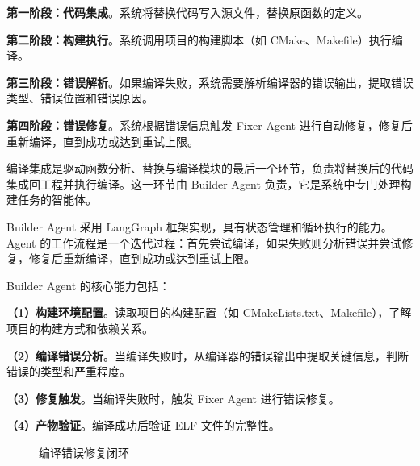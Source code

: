 \textbf{第一阶段：代码集成}。系统将替换代码写入源文件，替换原函数的定义。

\textbf{第二阶段：构建执行}。系统调用项目的构建脚本（如 CMake、Makefile）执行编译。

\textbf{第三阶段：错误解析}。如果编译失败，系统需要解析编译器的错误输出，提取错误类型、错误位置和错误原因。

\textbf{第四阶段：错误修复}。系统根据错误信息触发 Fixer Agent 进行自动修复，修复后重新编译，直到成功或达到重试上限。

编译集成是驱动函数分析、替换与编译模块的最后一个环节，负责将替换后的代码集成回工程并执行编译。这一环节由 Builder Agent 负责，它是系统中专门处理构建任务的智能体。

Builder Agent 采用 LangGraph 框架实现，具有状态管理和循环执行的能力。Agent 的工作流程是一个迭代过程：首先尝试编译，如果失败则分析错误并尝试修复，修复后重新编译，直到成功或达到重试上限。

Builder Agent 的核心能力包括：

\textbf{（1）构建环境配置}。读取项目的构建配置（如 CMakeLists.txt、Makefile），了解项目的构建方式和依赖关系。

\textbf{（2）编译错误分析}。当编译失败时，从编译器的错误输出中提取关键信息，判断错误的类型和严重程度。

\textbf{（3）修复触发}。当编译失败时，触发 Fixer Agent 进行错误修复。

\textbf{（4）产物验证}。编译成功后验证 ELF 文件的完整性。

\begin{figure}[htbp]
\centering
{}
\caption{编译错误修复闭环}
\label{fig:build-loop}
\end{figure}

